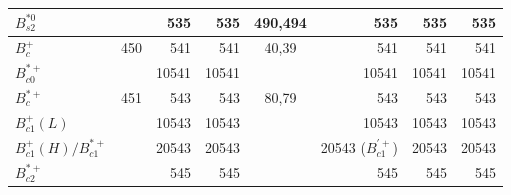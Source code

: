 \begin{tabular}{|l@{\tstrut}|r|r|r|c|r|r|r|}
$B_{s2}^{*0}$             &     &   535  &   535 & 490,494 &   535 &   535 & 535 \\ \hline\hline
$B_c^+$                   & 450 &   541  &   541 &   40,39 &   541 &   541 & 541 \\ \hline
$B_{c0}^{*+}$             &     & 10541  & 10541 &         & 10541 & 10541 & 10541 \\ \hline
$B_c^{*+}$                & 451 &   543  &   543 &   80,79 &   543 &   543 & 543 \\ \hline
$B_{c1}^+(L)$             &     & 10543  & 10543 &         & 10543 & 10543 & 10543 \\ \hline
$B_{c1}^+(H)/B_{c1}^{*+}$ &     & 20543  & 20543 &         & 20543 ($B_{c1}^{\prime +}$) & 20543 & 20543 \\ \hline
$B_{c2}^{*+}$             &     &   545  &   545 &         &   545 &   545 & 545 \\ \hline
\end{tabular}

